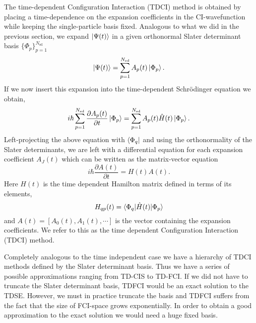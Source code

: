 \documentclass[a4paper,10pt, twocolumn]{article}
\begin{document}
The time-dependent Configuration Interaction (TDCI) method is obtained by placing a time-dependence on 
the expansion coefficients in the CI-wavefunction while keeping the single-particle basis fixed. Analogous to what we did in the previous section, we 
expand $\ket{\Psi(t)}$ in a given orthonormal Slater determinant basis $\{ \Phi_p\}_{p=1}^{N_{\text{sd}}}$
\begin{equation}
 \ket{\Psi(t)} = \sum_{p=1}^{N_{\text{sd}}} A_p(t) \ket{\Phi_p}.
\end{equation}
If we now insert this expansion into the time-dependent Schrödinger equation we obtain,
\begin{equation}
 i \hbar  \sum_{p=1}^{N_{\text{sd}}} \frac{\partial A_p(t)}{\partial t} \ket{\Phi_p} =  \sum_{p=1}^{N_{\text{sd}}} A_p(t) \hat{H}(t) \ket{\Phi_p}. 
\end{equation}
Left-projecting the above equation with $\bra{\Phi_q}$ and using the orthonormality of the Slater determinants, 
we are left with a differential equation for each expansion coefficient $A_J(t)$
which can be written as the matrix-vector equation
\begin{equation}
 i\hbar \frac{\partial A(t)}{\partial t} = H(t)A(t). \label{TDFCIEquation}
\end{equation}
Here $H(t)$ is the time dependent Hamilton matrix defined in terms of its elements,
\begin{equation}
 H_{qp}(t) = \braket{\Phi_q|\hat{H}(t)|\Phi_p}
\end{equation}
and $A(t) = [A_0(t), A_1(t), \cdots]$ is the vector containing the expansion coefficients. We refer to this as the 
time dependent Configuration Interaction (TDCI) method. 

Completely analogous to the time independent case we have a hierarchy of TDCI methods defined by the Slater determinant basis. Thus we have 
a series of possible approximations ranging from TD-CIS to TD-FCI.
If we did not have to truncate the Slater determinant basis, TDFCI would be an exact solution to the TDSE.
However, we must in practice truncate the basis and TDFCI suffers from the fact that the size of FCI-space grows exponentially. 
In order to obtain a good approximation to the exact solution we would need a huge fixed basis\cite{Kvaal12}.
\end{document}

